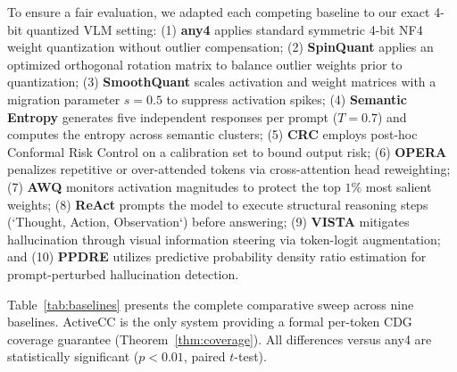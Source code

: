 \documentclass{ieeetmlcn}
\begin{document}
To ensure a fair evaluation, we adapted each competing baseline to our exact 4-bit quantized VLM setting: (1) \textbf{any4} \cite{elhoushi2025any} applies standard symmetric 4-bit NF4 weight quantization without outlier compensation; (2) \textbf{SpinQuant} \cite{liu2025spinquant} applies an optimized orthogonal rotation matrix to balance outlier weights prior to quantization; (3) \textbf{SmoothQuant} \cite{xiao2023smoothquant} scales activation and weight matrices with a migration parameter $s = 0.5$ to suppress activation spikes; (4) \textbf{Semantic Entropy} \cite{kuhn2023semantic} generates five independent responses per prompt ($T=0.7$) and computes the entropy across semantic clusters; (5) \textbf{CRC} \cite{angelopoulos2024conformal} employs post-hoc Conformal Risk Control on a calibration set to bound output risk; (6) \textbf{OPERA} \cite{huang2023opera} penalizes repetitive or over-attended tokens via cross-attention head reweighting; (7) \textbf{AWQ} \cite{lin2024awq} monitors activation magnitudes to protect the top $1\%$ most salient weights; (8) \textbf{ReAct} \cite{yao2022react} prompts the model to execute structural reasoning steps (`Thought, Action, Observation`) before answering; (9) \textbf{VISTA} \cite{li2025hidden} mitigates hallucination through visual information steering via token-logit augmentation; and (10) \textbf{PPDRE} \cite{Choi2021DensityRE} utilizes predictive probability density ratio estimation for prompt-perturbed hallucination detection.

Table~\ref{tab:baselines} presents the complete comparative sweep across nine baselines. ActiveCC is the only system providing a formal per-token CDG coverage guarantee (Theorem~\ref{thm:coverage}). All differences versus any4 are statistically significant ($p<0.01$, paired $t$-test).
\end{document}
